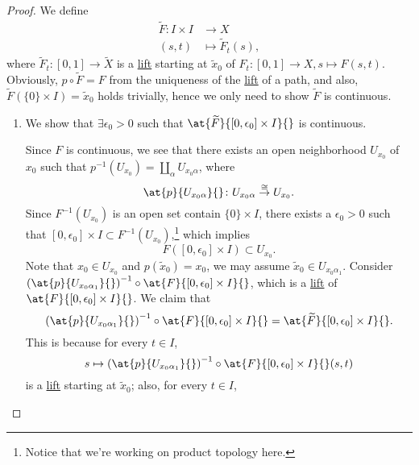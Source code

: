 \begin{proof}
	We define
	\[
		\begin{split}
			\widetilde{F} \colon I\times I &\to X\\
			(s, t)&\mapsto \widetilde{F} _{t} (s),
		\end{split}
	\]
	where \(\widetilde{F} _{t} \colon [0, 1]\to \widetilde{X}\) is a \hyperref[prop:homotopy-lifting-property]{lift} starting at \(\widetilde{x} _0\) of \(F_{t} \colon [0, 1]\to X, s\mapsto F(s, t)\).
	Obviously, \(p\circ \widetilde{F} = F\) from the uniqueness of the \hyperref[prop:homotopy-lifting-property]{lift} of a path, and also, \(\widetilde{F} (\{0\}\times I) = \widetilde{x} _0\)
	holds trivially, hence we only need to show \(\widetilde{F} \) is continuous.
	\begin{enumerate}
		\item We show that \(\exists \epsilon _0>0\) such that \(\at{\widetilde{F} }{[0, \epsilon _0]\times I}{} \) is continuous.
		      \begin{figure}[H]
			      \centering
			      \label{fig:pf:col:lec14-5}
		      \end{figure}
		      Since \(F\) is continuous, we see that there exists an open neighborhood \(U_{x_0}\) of \(x_0\) such that \(p^{-1} (U_{x_0})= \coprod_\alpha U_{x_0 \alpha } \), where
		      \[
			      \at{p}{U_{x_0 \alpha }}{} \colon U_{x_0 \alpha }\overset{\cong }{\to } U_{x_0}.
		      \]
		      Since \(F^{-1} (U_{x_0})\) is an open set contain \(\{0\}\times I\), there exists a \(\epsilon _0>0\) such that \([0, \epsilon _0]\times I\subset F^{-1} (U_{x_0})\),\footnote{Notice that we're working on product topology here.}
		      which implies
		      \[
			      F\left([0, \epsilon _0]\times I\right)\subset U_{x_0}.
		      \]
		      Note that \(x_0\in U_{x_0}\) and \(p(\widetilde{x} _0) = x_0\), we may assume \(\widetilde{x} _0\in U_{x_0 \alpha _1}\). Consider \(\left(\at{p}{U_{x_0 \alpha _1}}{} \right)^{-1} \circ \at{F}{[0, \epsilon _0]\times I}{} \),
		      which is a \hyperref[prop:homotopy-lifting-property]{lift} of \(\at{F}{[0, \epsilon _0]\times I}{} \). We claim that
		      \[
			      \left(\at{p}{U_{x_0 \alpha _1}}{} \right)^{-1} \circ \at{F}{[0, \epsilon _0]\times I}{} = \at{\widetilde{F} }{[0, \epsilon _0]\times I}{}.
		      \]
		      This is because for every \(t\in I\),
		      \[
			      s\mapsto \left(\at{p}{U_{x_0 \alpha _1}}{} \right)^{-1} \circ \at{F}{[0, \epsilon _0]\times I}{}(s, t)
		      \]
		      is a \hyperref[prop:homotopy-lifting-property]{lift} starting at \(\widetilde{x} _0\); also, for every \(t\in I\),

\end{enumerate}
\end{proof}
